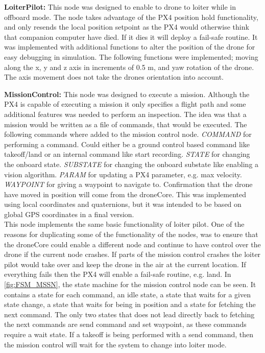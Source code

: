 \documentclass[../Head/Main.tex]{subfiles}
\begin{document}
\textbf{LoiterPilot:}
This node was designed to enable to drone to loiter while in offboard mode. The node takes advantage of the PX4 position hold functionality, and only resends the local position setpoint as the PX4 would otherwise think that companion computer have died. If it dies it will deploy a fail-safe routine. It was implemented with additional functions to alter the position of the drone for easy debugging in simulation. The following functions were implemented; moving along the x, y and z axis in increments of 0.5 m, and yaw rotation of the drone. The axis movement does not take the drones orientation into account. 
\par 

\clearpage
\textbf{MissionControl:}
This node was designed to execute a mission. Although the PX4 is capable of executing a mission it only specifies a flight path and some additional features was needed to perform an inspection. The idea was that a mission would be written as a file of commands, that would be executed. The following commands where added to the mission control node. \textit{COMMAND} for performing a command. Could either be a ground control based command like takeoff/land or an internal command like start recording. \textit{STATE} for changing the onboard state. \textit{SUBSTATE} for changing the onboard substate like enabling a vision algorithm. \textit{PARAM} for updating a PX4 parameter, e.g. max velocity. \textit{WAYPOINT} for giving a waypoint to navigate to. Confirmation that the drone have moved in position will come from the droneCore. This was implemented using local coordinates and quaternions, but it was intended to be based on global GPS coordinates in a final version.\\
This node implements the same basic functionality of loiter pilot. One of the reasons for duplicating some of the functionality of the nodes, was to ensure that the droneCore could enable a different node and continue to have control over the drone if the current node crashes. If parts of the mission control crashes the loiter pilot would take over and keep the drone in the air at the current location. If everything fails then the PX4 will enable a fail-safe routine, e.g. land.
In \autoref{fig:FSM_MSSN}, the state machine for the mission control node can be seen. It contains a state for each command, an idle state, a state that waits for a given state change, a state that waits for being in position and a state for fetching the next command. The only two states that does not lead directly back to fetching the next commands are send command and set waypoint, as these commands require a wait state. If a takeoff is being performed with a send command, then the mission control will wait for the system to change into loiter mode.
\end{document}
